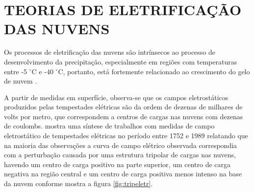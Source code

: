 








\section{TEORIAS DE ELETRIFICAÇÃO DAS NUVENS}

Os processos de eletrificação das nuvens são intrínsecos ao processo de desenvolvimento da precipitação, especialmente em regiões com temperaturas entre -5 $^{\circ}$C e -40 $^{\circ}$C, portanto, está fortemente relacionado ao crescimento do gelo de nuvem \cite{mason1953}. 

A partir de medidas em superfície, observa-se que os campos eletrostáticos produzidos pelas tempestades elétricas são da ordem de dezenas de milhares de volts por metro, que correspondem a centros de cargas nas nuvens com dezenas de coulombs. 
 mostra uma síntese de trabalhos com medidas de campo eletrostático de tempestades elétricas no período entre 1752 e 1989 relatando que na maioria das observações a curva de campo elétrico observada correspondia com a perturbação causada por uma estrutura tripolar de cargas nas nuvens, havendo um centro de carga positivo na parte superior, um centro de carga negativa na região central e um centro de carga positiva menos intenso na base da nuvem conforme mostra a figura \ref{fig:tripeletr}.


